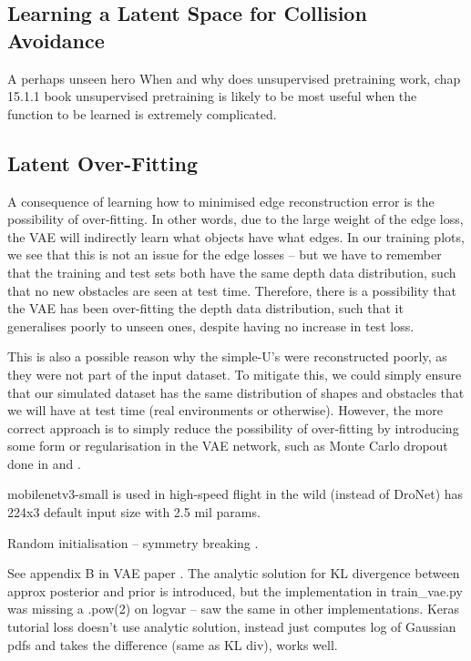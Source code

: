\subsection{Learning a Latent Space for Collision Avoidance}
A perhaps unseen hero
When and why does unsupervised pretraining work, chap 15.1.1 book
unsupervised pretraining is likely to be most useful when the function to be learned is extremely complicated. \cite{DeepLearningBook}



\subsection{Latent Over-Fitting}
A consequence of learning how to minimised edge reconstruction error is the possibility of over-fitting. In other words, due to the large weight of the edge loss, the VAE will indirectly learn what objects have what edges. In our training plots, we see that this is not an issue for the edge losses -- but we have to remember that the training and test sets both have the same depth data distribution, such that no new obstacles are seen at test time. Therefore, there is a possibility that the VAE has been over-fitting the depth data distribution, such that it generalises poorly to unseen ones, despite having no increase in test loss. 

This is also a possible reason why the simple-U's were reconstructed poorly, as they were not part of the input dataset. To mitigate this, we could simply ensure that our simulated dataset has the same distribution of shapes and obstacles that we will have at test time (real environments or otherwise). However, the more correct approach is to simply reduce the possibility of over-fitting by introducing some form or regularisation in the VAE network, such as Monte Carlo dropout done in \cite{dronet} and \cite{deepCollisionPredictorOracle}.







mobilenetv3-small is used in high-speed flight in the wild (instead of DroNet) has 224x3 default input size with 2.5 mil params. 

Random initialisation -- symmetry breaking \cite{LectureNotesSparseAutoencoder}.

See appendix B in VAE paper \cite{variational_bayes}. The analytic solution for KL divergence between approx posterior and prior is introduced, but the implementation in train\_vae.py was missing a .pow(2) on logvar -- saw the same in other implementations. Keras tutorial loss doesn't use analytic solution, instead just computes log of Gaussian pdfs and takes the difference (same as KL div), works well.

